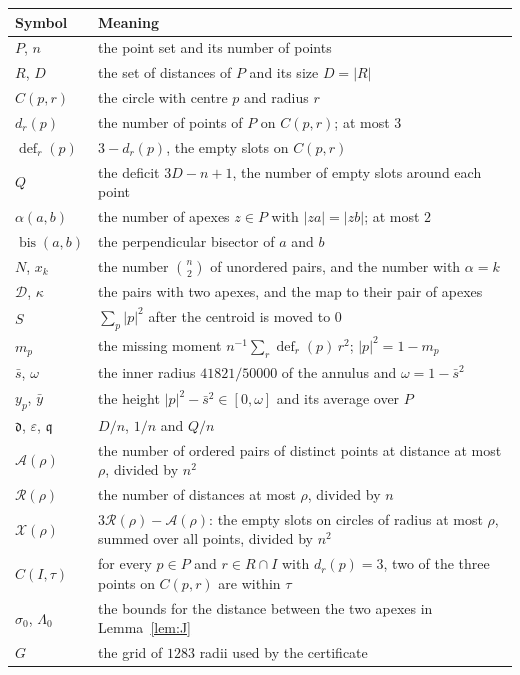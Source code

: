 \documentclass[11pt]{article}
\newcommand{\eps}{\varepsilon}
\newcommand{\cA}{\mathcal{A}}
\newcommand{\cR}{\mathcal{R}}
\newcommand{\cX}{\mathcal{X}}
\newcommand{\cD}{\mathcal{D}}
\newcommand{\dd}{\mathfrak{d}}
\newcommand{\qq}{\mathfrak{q}}
\newcommand{\sbar}{\bar{s}}
\newcommand{\ybar}{\bar{y}}
\newcommand{\bis}{\operatorname{bis}}
\theoremstyle{remark}
\begin{document}
\begin{center}
\small
\begin{tabular}{lp{11.2cm}}
\toprule
Symbol & Meaning\\
\midrule
$P$, $n$ & the point set and its number of points\\
$R$, $D$ & the set of distances of $P$ and its size $D = |R|$\\
$C(p,r)$ & the circle with centre $p$ and radius $r$\\
$d_r(p)$ & the number of points of $P$ on $C(p,r)$; at most $3$\\
$\operatorname{def}_r(p)$ & $3 - d_r(p)$, the empty slots on $C(p,r)$\\
$Q$ & the deficit $3D - n + 1$, the number of empty slots around each point\\
$\alpha(a,b)$ & the number of apexes $z \in P$ with $|za| = |zb|$; at most $2$\\
$\bis(a,b)$ & the perpendicular bisector of $a$ and $b$\\
$N$, $x_k$ & the number $\binom n2$ of unordered pairs, and the number with $\alpha = k$\\
$\cD$, $\kappa$ & the pairs with two apexes, and the map to their pair of apexes\\
$S$ & $\sum_p |p|^2$ after the centroid is moved to $0$\\
$m_p$ & the missing moment $n^{-1}\sum_r \operatorname{def}_r(p)\,r^2$; $|p|^2 = 1 - m_p$\\
$\sbar$, $\omega$ & the inner radius $41821/50000$ of the annulus and $\omega = 1 - \sbar^2$\\
$y_p$, $\ybar$ & the height $|p|^2 - \sbar^2 \in [0,\omega]$ and its average over $P$\\
$\dd$, $\eps$, $\qq$ & $D/n$, $1/n$ and $Q/n$\\
$\cA(\rho)$ & the number of ordered pairs of distinct points at distance at most $\rho$, divided by $n^2$\\
$\cR(\rho)$ & the number of distances at most $\rho$, divided by $n$\\
$\cX(\rho)$ & $3\cR(\rho) - \cA(\rho)$: the empty slots on circles of radius at most $\rho$, summed over all points, divided by $n^2$\\
$C(I,\tau)$ & for every $p \in P$ and $r \in R \cap I$ with $d_r(p) = 3$, two of the three points on $C(p,r)$ are within $\tau$\\
$\sigma_0$, $\Lambda_0$ & the bounds for the distance between the two apexes in Lemma~\ref{lem:J}\\
$G$ & the grid of $1283$ radii used by the certificate\\
\bottomrule
\end{tabular}
\end{center}
\end{document}
